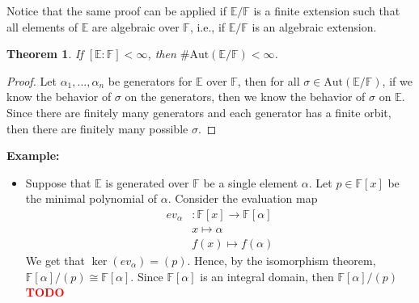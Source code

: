 \documentclass{article}
\newtheorem*{theorem}{Theorem}
\newcommand{\F}{\mathbb{F}}
\newcommand{\E}{\mathbb{E}}
\newcommand{\isomorphic}{\cong}
\newcommand{\Aut}{\text{Aut}}
\newcommand{\td}{\textcolor{red}{\textbf{TODO}}}
\newenvironment{example}{\noindent\textbf{Example:} \vspace{-0.2cm}\begin{itemize}}{\end{itemize}}
\begin{document}
Notice that the same proof can be applied if $\E / \F$ is a finite extension such that all elements of $\E$ are algebraic over $\F$, i.e., if $\E / \F$ is an algebraic extension.

\begin{theorem}
    If $[\E : \F] < \infty$, then $\#\Aut(\E / \F) < \infty$.
\end{theorem}

\begin{proof}
    Let $\alpha_1, ..., \alpha_n$ be generators for $\E$ over $\F$, then for all $\sigma \in \Aut(\E / \F)$, if we know the behavior of $\sigma$ on the generators, then we know the behavior of $\sigma$ on $\E$. Since there are finitely many generators and each generator has a finite orbit, then there are finitely many possible $\sigma$.
\end{proof}

\begin{example}
    \item Suppose that $\E$ is generated over $\F$ be a single element $\alpha$. Let $p \in \F[x]$ be the minimal polynomial of $\alpha$. Consider the evaluation map 
    \begin{align*}
        ev_{\alpha} &: \F[x] \to \F[\alpha] \\
        & x \mapsto \alpha \\
        & f(x) \mapsto f(\alpha)
    \end{align*}
    We get that $\ker(ev_{\alpha}) = (p)$. Hence, by the isomorphism theorem, $\F[\alpha]/(p) \isomorphic \F[\alpha]$. Since $\F[\alpha]$ is an integral domain, then $\F[\alpha]/(p)$ \td  
\end{example}
\end{document}
